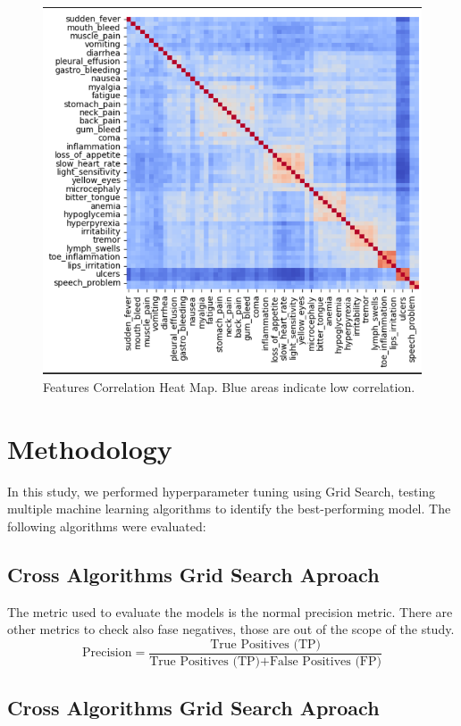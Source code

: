 \documentclass{article}
\begin{document}
\begin{figure}[H]  
\centering
\includegraphics[width=1\linewidth]{CorrelationMatrix.png}
\caption{Features Correlation Heat Map. Blue areas indicate low correlation.}
\vspace{-1em} %
\end{figure}

\section{Methodology}
In this study, we performed hyperparameter tuning using Grid Search, testing multiple machine learning algorithms to identify the best-performing model. The following algorithms were evaluated:

\subsection{Cross Algorithms Grid Search Aproach}
The metric used to evaluate the models is the normal precision metric.
There are other metrics to check also fase negatives, those are out of the scope of the study.
\[
\text{Precision} = \frac{\text{True Positives (TP)}}{\text{True Positives (TP)} + \text{False Positives (FP)}}
\]
\subsection{Cross Algorithms Grid Search Aproach}
\end{document}
